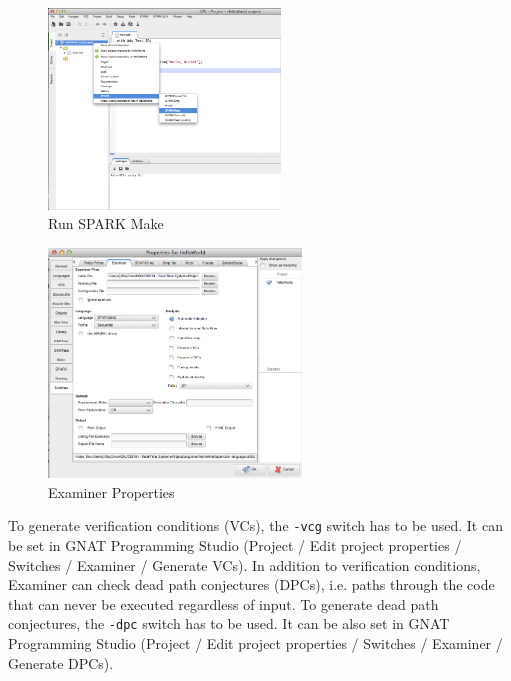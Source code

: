 \begin{figure}[ht]%
    \begin{center}
    	\includegraphics[width=0.55\textwidth]{figures/SPARKMake.png}    	
    \end{center}
    \caption{Run SPARK Make}
    \label{figure:sparkmake}
\end{figure}

\begin{figure}[ht]%
    \begin{center}
    	\includegraphics[width=0.6\textwidth]{figures/Properties-Switches-Examiner.png}    	
    \end{center}
    \caption{Examiner Properties}
    \label{figure:examinerproperties}
\end{figure}

To generate verification conditions (VCs), the \lstinline{-vcg} switch has to be used. It can be set in GNAT Programming Studio (Project / Edit project properties / Switches / Examiner / Generate VCs).
In addition to verification conditions, Examiner can check dead path conjectures (DPCs), i.e. paths through the code that can never be executed regardless of input. To generate dead path conjectures, the \lstinline{-dpc} switch has to be used. It can be also set in GNAT Programming Studio (Project / Edit project properties / Switches / Examiner / Generate DPCs).

